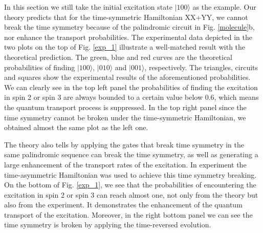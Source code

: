 \documentclass[aps,pra,12pt,nofootinbib,superscriptaddress,longbibliography,showpacs]{revtex4-1}
\theoremstyle{plain}
\theoremstyle{definition}
\newcommand{\ket}[1]{\ensuremath{|#1\rangle}}
\begin{document}
In this section we still take the initial excitation state $\ket{100}$ as the example. Our theory predicts that for the time-symmetric Hamiltonian XX+YY, we cannot break the time symmetry because of the palindromic circuit in Fig. \ref{molecule}b, nor enhance the transport probabilities. The experimental data depicted in the two plots on the top of Fig. \ref{exp_1} illustrate a well-matched result with the theoretical prediction. The green, blue and red curves are the theoretical probabilities of finding $\ket{100}$, $\ket{010}$ and $\ket{001}$, respectively. The triangles, circuits and squares show the experimental results of the aforementioned probabilities. We can clearly see in the top left panel the probabilities of finding the excitation in spin 2 or spin 3 are always bounded to a certain value below 0.6, which means the quantum transport process is suppressed. In the top right panel since the time symmetry cannot be broken under the time-symmetric Hamiltonian, we obtained almost the same plot as the left one.

The theory also tells by applying the gates that break time symmetry in the same palindromic sequence can break the time symmetry, as well as generating a large enhancement of the transport rates of the excitation. In experiment the time-asymmetric Hamiltonian was used to achieve this time symmetry breaking. On the bottom of Fig. \ref{exp_1}, we see that the probabilities of encountering the excitation in spin 2 or spin 3 can reach almost one, not only from the theory but also from the experiment. It demonstrates the enhancement of the quantum transport of the excitation. Moreover, in the right bottom panel we can see the time symmetry is broken by applying the time-reversed evolution.
\end{document}
